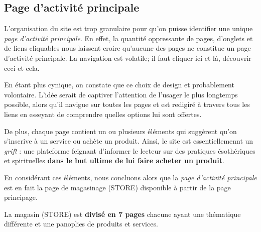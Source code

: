 \documentclass[9pt]{report}
\begin{document}
\begin{multicols*}{2}
  \section{Page d'activité principale}
  L'organisation du site est trop granulaire pour qu'on puisse identifier 
  une unique \textit{page d'activité principale}. En effet, la quantité 
  oppressante de pages, d'onglets et de liens cliquables nous laissent 
  croire qu'aucune des pages ne constitue un page d'activité principale. 
  La navigation est volatile; il faut cliquer ici et là, découvrir ceci et 
  cela. 

  En étant plus cynique, on constate que ce choix de design et probablement 
  volontaire. L'idée serait de captiver l'attention  de l'usager le plus 
  longtemps possible, alors qu'il navigue sur toutes les pages 
  et est redigiré à travers tous les liens en esseyant de comprendre 
  quelles options lui sont offertes. 
  
  De plus, chaque page contient un ou plusieurs éléments qui suggèrent 
  qu'on s'inscrive à un service ou achète un produit. Ainsi, le site 
  est essentiellemennt un \textit{grift} : une plateforme feignant 
  d'informer le lecteur sur des pratiques ésothériques et spirituelles 
  \textbf{dans le but ultime de lui faire acheter un produit}.
  
  En considérant ces éléments, nous concluons alors que la 
  \textit{page d'activité principale} est en fait la page de magasinage 
  (STORE) disponible à partir de la page principage.

  \begin{note}{}{}
    La magasin (STORE) est \textbf{divisé en 7 pages} chacune ayant une thématique 
    différente et une panoplies de produits et services. 
  \end{note}


    \begin{figure}[H]
    \scriptsize{
     }
    \end{figure}


\end{multicols*}
\end{document}
